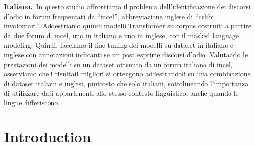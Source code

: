 \documentclass[11pt]{article}
\begin{document}
\begin{abstract-alt}
 \textrm{\bf{Italiano.}}~In questo studio affrontiamo il problema dell'identificazione dei discorsi d'odio in forum frequentati da ``incel'', abbreviazione inglese di ``celibi involontari''. Addestriamo quindi modelli Transformer su corpus costruiti a partire da due forum di incel, uno in italiano e uno in inglese, con il masked language modeling. Quindi, facciamo il fine-tuning dei modelli su dataset in italiano e inglese con annotazioni indicanti se un post esprime discorsi d'odio.
 Valutando le prestazioni dei modelli su un dataset ottenuto da un forum italiano di incel, osserviamo che i risultati migliori si ottengono addestrandoli su una combinazione di dataset italiani e inglesi, piuttosto che solo italiani, sottolineando l'importanza di utilizzare dati appartenenti allo stesso contesto linguistico, anche quando le lingue differiscono.
 
\end{abstract-alt}


\section{Introduction}
\end{document}
